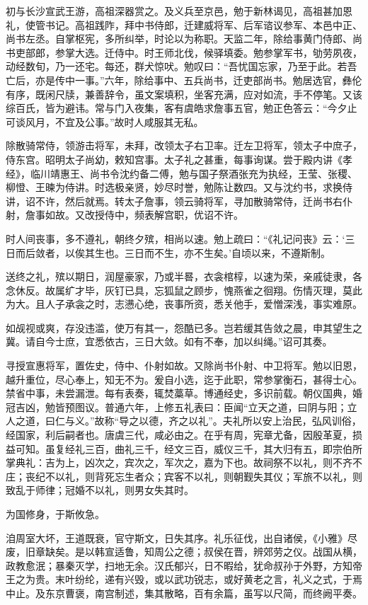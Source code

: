\documentclass[12pt,UTF8]{ctexbook}
\begin{document}
初与长沙宣武王游，高祖深器赏之。及义兵至京邑，勉于新林谒见，高祖甚加恩礼，使管书记。高祖践阼，拜中书侍郎，迁建威将军、后军谘议参军、本邑中正、尚书左丞。自掌枢宪，多所纠举，时论以为称职。天监二年，除给事黄门侍郎、尚书吏部郎，参掌大选。迁侍中。时王师北伐，候驿填委。勉参掌军书，劬劳夙夜，动经数旬，乃一还宅。每还，群犬惊吠。勉叹曰：“吾忧国忘家，乃至于此。若吾亡后，亦是传中一事。”六年，除给事中、五兵尚书，迁吏部尚书。勉居选官，彝伦有序，既闲尺牍，兼善辞令，虽文案填积，坐客充满，应对如流，手不停笔。又该综百氏，皆为避讳。常与门入夜集，客有虞皓求詹事五官，勉正色答云：“今夕止可谈风月，不宜及公事。”故时人咸服其无私。

除散骑常侍，领游击将军，未拜，改领太子右卫率。迁左卫将军，领太子中庶子，侍东宫。昭明太子尚幼，敕知宫事。太子礼之甚重，每事询谋。尝于殿内讲《孝经》，临川靖惠王、尚书令沈约备二傅，勉与国子祭酒张充为执经，王莹、张稷、柳憕、王暕为侍讲。时选极亲贤，妙尽时誉，勉陈让数四。又与沈约书，求换侍讲，诏不许，然后就焉。转太子詹事，领云骑将军，寻加散骑常侍，迁尚书右仆射，詹事如故。又改授侍中，频表解宫职，优诏不许。

时人间丧事，多不遵礼，朝终夕殡，相尚以速。勉上疏曰：“《礼记问丧》云：‘三日而后敛者，以俟其生也。三日而不生，亦不生矣。’自顷以来，不遵斯制。

送终之礼，殡以期日，润屋豪家，乃或半晷，衣衾棺椁，以速为荣，亲戚徒隶，各念休反。故属纩才毕，灰钉已具，忘狐鼠之顾步，愧燕雀之徊翔。伤情灭理，莫此为大。且人子承衾之时，志懑心绝，丧事所资，悉关他手，爱憎深浅，事实难原。

如觇视或爽，存没违滥，使万有其一，怨酷已多。岂若缓其告敛之晨，申其望生之冀。请自今士庶，宜悉依古，三日大敛。如有不奉，加以纠绳。”诏可其奏。

寻授宣惠将军，置佐史，侍中、仆射如故。又除尚书仆射、中卫将军。勉以旧恩，越升重位，尽心奉上，知无不为。爰自小选，迄于此职，常参掌衡石，甚得士心。禁省中事，未尝漏泄。每有表奏，辄焚藁草。博通经史，多识前载。朝仪国典，婚冠吉凶，勉皆预图议。普通六年，上修五礼表曰：臣闻“立天之道，曰阴与阳；立人之道，曰仁与义。”故称“导之以德，齐之以礼”。夫礼所以安上治民，弘风训俗，经国家，利后嗣者也。唐虞三代，咸必由之。在乎有周，宪章尤备，因殷革夏，损益可知。虽复经礼三百，曲礼三千，经文三百，威仪三千，其大归有五，即宗伯所掌典礼：吉为上，凶次之，宾次之，军次之，嘉为下也。故祠祭不以礼，则不齐不庄；丧纪不以礼，则背死忘生者众；宾客不以礼，则朝觐失其仪；军旅不以礼，则致乱于师律；冠婚不以礼，则男女失其时。

为国修身，于斯攸急。

洎周室大坏，王道既衰，官守斯文，日失其序。礼乐征伐，出自诸侯，《小雅》尽废，旧章缺矣。是以韩宣适鲁，知周公之德；叔侯在晋，辨郊劳之仪。战国从横，政教愈泯；暴秦灭学，扫地无余。汉氏郁兴，日不暇给，犹命叔孙于外野，方知帝王之为贵。末叶纷纶，递有兴毁，或以武功锐志，或好黄老之言，礼义之式，于焉中止。及东京曹褒，南宫制述，集其散略，百有余篇，虽写以尺简，而终阙平奏。
\end{document}
